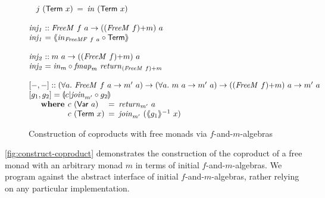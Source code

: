 \documentclass{jfp1}
\newcommand{\eFold}[2]{\llparenthesis #1|#2 \rrparenthesis}
\newcommand{\fmext}[1]{\langle\kern-0.25em\langle #1 \rangle\kern-0.25em\rangle}
\newcommand{\kw}[1]{\textbf{#1}}
\begin{document}
\begin{figure}
\begin{displaymath}
\begin{array}{@{}l}
\begin{array}{@{}l}
\begin{array}{r@{\hspace{0.4em}}l@{\hspace{0.5em}}c@{\hspace{0.5em}}l}
          & j~(\mathsf{Term}~x) &=& \mathit{in}~(\mathsf{Term}~x)
        \end{array}
      \end{array} \\
      \\
      \mathit{inj_1} :: \mathit{FreeM}~f~a \to (\cprd{(\mathit{FreeM}~f)}{m})~a \\
      \mathit{inj_1} = \fmext{\mathit{in}_{\mathit{FreeMF}~f~a} \circ \mathsf{Term}} \\
      \\
      \mathit{inj_2} :: m~a \to (\cprd{(\mathit{FreeM}~f)}{m})~a \\
      \mathit{inj_2} = \mathit{in}_m \circ \mathit{fmap}_m~\mathit{return}_{\cprd{(\mathit{FreeM}~f)}{m}}\\
      \\
      \begin{array}{@{}l}
        {}[-,-] :: (\forall a.~\mathit{FreeM}~f~a \to m'~a) \to (\forall a.~m~a \to m'~a) \to (\cprd{(\mathit{FreeM}~f)}{m})~a \to m'~a \\
        {}[g_1,g_2] = \eFold{c}{\mathit{join}_{m'} \circ g_2} \\
        \quad\begin{array}{r@{\hspace{0.4em}}l@{\hspace{0.5em}}c@{\hspace{0.5em}}l}
          \kw{where} & c~(\mathsf{Var}~a) &=& \mathit{return}_{m'}~a \\
          & c~(\mathsf{Term}~x) &=& \mathit{join}_{m'}~(\fmext{g_1}^{-1}~x)
        \end{array}
      \end{array}
    \end{array}
  \end{displaymath}
  \caption{Construction of coproducts with free monads via $f$-and-$m$-algebras}
  \label{fig:construct-coproduct}
\end{figure}

\autoref{fig:construct-coproduct} demonstrates the construction of the
coproduct of a free monad with an arbitrary monad $m$ in terms of
initial $f$-and-$m$-algebras. We program against the abstract
interface of initial $f$-and-$m$-algebras, rather relying on any
particular implementation.

\end{document}
